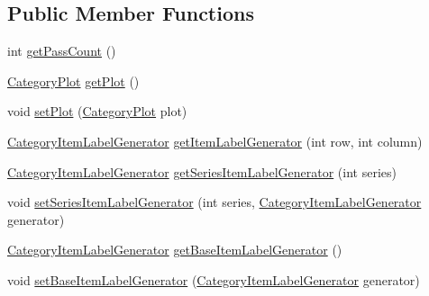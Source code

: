 \subsection*{Public Member Functions}
\begin{DoxyCompactItemize}
\item 
int \mbox{\hyperlink{classorg_1_1jfree_1_1chart_1_1renderer_1_1category_1_1_abstract_category_item_renderer_a9386cde1d834a511647d468b68976f64}{get\+Pass\+Count}} ()
\item 
\mbox{\hyperlink{classorg_1_1jfree_1_1chart_1_1plot_1_1_category_plot}{Category\+Plot}} \mbox{\hyperlink{classorg_1_1jfree_1_1chart_1_1renderer_1_1category_1_1_abstract_category_item_renderer_a83ebcad71dce7b3494225aa077667296}{get\+Plot}} ()
\item 
void \mbox{\hyperlink{classorg_1_1jfree_1_1chart_1_1renderer_1_1category_1_1_abstract_category_item_renderer_ace23a8e40019e23cde2ff8e729bb36a0}{set\+Plot}} (\mbox{\hyperlink{classorg_1_1jfree_1_1chart_1_1plot_1_1_category_plot}{Category\+Plot}} plot)
\item 
\mbox{\hyperlink{interfaceorg_1_1jfree_1_1chart_1_1labels_1_1_category_item_label_generator}{Category\+Item\+Label\+Generator}} \mbox{\hyperlink{classorg_1_1jfree_1_1chart_1_1renderer_1_1category_1_1_abstract_category_item_renderer_ab681e0113f33ce79948caf655729227b}{get\+Item\+Label\+Generator}} (int row, int column)
\item 
\mbox{\hyperlink{interfaceorg_1_1jfree_1_1chart_1_1labels_1_1_category_item_label_generator}{Category\+Item\+Label\+Generator}} \mbox{\hyperlink{classorg_1_1jfree_1_1chart_1_1renderer_1_1category_1_1_abstract_category_item_renderer_a2ec1e67d9952e7d8d39ba4a9f59184f7}{get\+Series\+Item\+Label\+Generator}} (int series)
\item 
void \mbox{\hyperlink{classorg_1_1jfree_1_1chart_1_1renderer_1_1category_1_1_abstract_category_item_renderer_a68950a45e273433edc3343a958860bf6}{set\+Series\+Item\+Label\+Generator}} (int series, \mbox{\hyperlink{interfaceorg_1_1jfree_1_1chart_1_1labels_1_1_category_item_label_generator}{Category\+Item\+Label\+Generator}} generator)
\item 
\mbox{\hyperlink{interfaceorg_1_1jfree_1_1chart_1_1labels_1_1_category_item_label_generator}{Category\+Item\+Label\+Generator}} \mbox{\hyperlink{classorg_1_1jfree_1_1chart_1_1renderer_1_1category_1_1_abstract_category_item_renderer_a8cb1f3366a62871739928e4b5c75ade5}{get\+Base\+Item\+Label\+Generator}} ()
\item 
void \mbox{\hyperlink{classorg_1_1jfree_1_1chart_1_1renderer_1_1category_1_1_abstract_category_item_renderer_a3752262b1c62f959e47ba3542e1e7149}{set\+Base\+Item\+Label\+Generator}} (\mbox{\hyperlink{interfaceorg_1_1jfree_1_1chart_1_1labels_1_1_category_item_label_generator}{Category\+Item\+Label\+Generator}} generator)

\end{DoxyCompactItemize}
